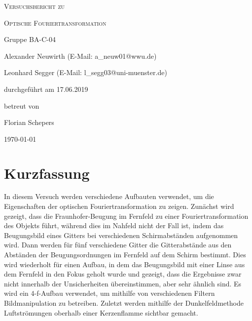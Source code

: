 \documentclass[
	a4paper,
	12pt,
	pagesize,
	ngerman
]{scrartcl}
\begin{document}
	\begin{titlepage}
		\centering
		{\scshape\LARGE Versuchsbericht zu \par}
		\vspace{1cm}
		{\scshape\huge Optische Fouriertransformation \par}
		\vspace{2.5cm}
		{\LARGE Gruppe BA-C-04 \par}
		\vspace{0.5cm}

		{\large Alexander Neuwirth (E-Mail: a\_neuw01@wwu.de) \par}
		{\large Leonhard Segger (E-Mail: l\_segg03@uni-muenster.de) \par}
		\vfill

		durchgeführt am 17.06.2019\par
		betreut von\par
		{\large Florian Schepers}

		\vfill

		{\large \today\par}
	\end{titlepage}
	\tableofcontents
	\newpage


	\section{Kurzfassung}
	In diesem Versuch werden verschiedene Aufbauten verwendet, um die Eigenschaften der optischen Fouriertransformation zu zeigen.
	Zunächst wird gezeigt, dass die Fraunhofer-Beugung im Fernfeld zu einer Fouriertransformation des Objekts führt, während dies im Nahfeld nicht der Fall ist, indem das Beugungsbild eines Gitters bei verschiedenen Schirmabständen aufgenommen wird.
	Dann werden für fünf verschiedene Gitter die Gitterabstände aus den Abständen der Beugungsordnungen im Fernfeld auf dem Schirm bestimmt.
	Dies wird wiederholt für einen Aufbau, in dem das Beugungsbild mit einer Linse aus dem Fernfeld in den Fokus geholt wurde und gezeigt, dass die Ergebnisse zwar nicht innerhalb der Unsicherheiten übereinstimmen, aber sehr ähnlich sind.
	Es wird ein 4-f-Aufbau verwendet, um mithilfe von verschiedenen Filtern Bildmanipulation zu betreiben.
	Zuletzt werden mithilfe der Dunkelfeldmethode Luftströmungen oberhalb einer Kerzenflamme sichtbar gemacht.
\end{document}

